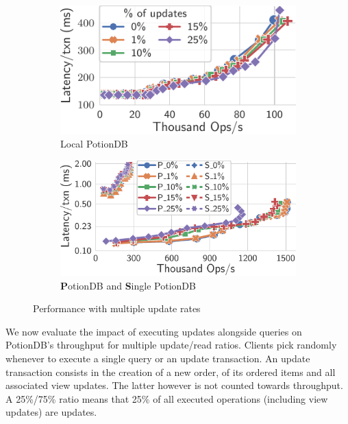 \documentclass[sigplan,review,anonymous]{acmart}
\begin{document}
\begin{figure}
	\centering
	\begin{subfigure}{.47\linewidth}
		\includegraphics[width=1\linewidth]{singleQuery/upd_rate_local_tc_short}
		\caption{Local PotionDB}
		\label{fig:update_rates_local_tc}
	\end{subfigure}%
	\hspace*{0.2em}
	\begin{subfigure}{.52\linewidth}
		\includegraphics[width=1\linewidth]{singleQuery/upd_rate_tc_global_vs_single}
		\caption{\textbf{P}otionDB and \textbf{S}ingle PotionDB}
		\label{fig:update_rates_global_single_tc}
	\end{subfigure}%
	\vspace*{-0.65em}
	\caption{Performance with multiple update rates}
	\label{fig:upds_tc}
	\vspace*{-1.2em}
\end{figure}


We now evaluate the impact of executing updates alongside queries on PotionDB's throughput for multiple update/read ratios.
Clients pick randomly
whenever to execute a single query or an update transaction.
An update transaction consists in the creation of a new order, of its ordered items and all associated view updates.
The latter however is not counted towards throughput.
A 25\%/75\% ratio means that 25\% of all executed operations (including view updates) are updates.%
\end{document}
